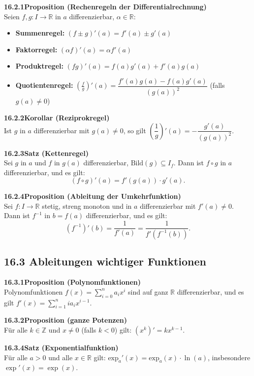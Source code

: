 \documentclass[a4paper,12pt]{article}
\newcommand{\gentry}[3]{%
  \noindent\textbf{#1\quad #2}\nopagebreak\\[0.2em]
  #3\par\smallskip
}
\begin{document}
\gentry{16.2.1}{Proposition (Rechenregeln der Differentialrechnung)}{%
  Seien $f, g: I \to \mathbb{R}$ in $a$ differenzierbar, $\alpha \in \mathbb{R}$:
  \begin{itemize}[topsep=2pt,itemsep=1pt]
    \item \textbf{Summenregel:} $(f \pm g)'(a) = f'(a) \pm g'(a)$
    \item \textbf{Faktorregel:} $(\alpha f)'(a) = \alpha f'(a)$
    \item \textbf{Produktregel:} $(fg)'(a) = f(a)g'(a) + f'(a)g(a)$
    \item \textbf{Quotientenregel:} $\left(\frac{f}{g}\right)'(a) = \dfrac{f'(a)g(a) - f(a)g'(a)}{(g(a))^2}$
      \quad (falls $g(a) \neq 0$)
  \end{itemize}
}

\gentry{16.2.2}{Korollar (Reziprokregel)}{%
  Ist $g$ in $a$ differenzierbar mit $g(a) \neq 0$, so gilt
  $\left(\dfrac{1}{g}\right)'(a) = -\dfrac{g'(a)}{(g(a))^2}$.
}

\gentry{16.2.3}{Satz (Kettenregel)}{%
  Sei $g$ in $a$ und $f$ in $g(a)$ differenzierbar, $\mathrm{Bild}(g) \subseteq I_f$.
  Dann ist $f \circ g$ in $a$ differenzierbar, und es gilt:
  \[
    (f \circ g)'(a) = f'(g(a)) \cdot g'(a).
  \]
}

\gentry{16.2.4}{Proposition (Ableitung der Umkehrfunktion)}{%
  Sei $f: I \to \mathbb{R}$ stetig, streng monoton und in $a$ differenzierbar mit
  $f'(a) \neq 0$. Dann ist $f^{-1}$ in $b = f(a)$ differenzierbar, und es gilt:
  \[
    (f^{-1})'(b) = \frac{1}{f'(a)} = \frac{1}{f'(f^{-1}(b))}.
  \]
}

\subsection*{16.3 \quad Ableitungen wichtiger Funktionen}

\gentry{16.3.1}{Proposition (Polynomfunktionen)}{%
  Polynomfunktionen $f(x) = \sum_{i=0}^n a_i x^i$ sind auf ganz $\mathbb{R}$
  differenzierbar, und es gilt $f'(x) = \sum_{i=1}^n i a_i x^{i-1}$.
}

\gentry{16.3.2}{Proposition (ganze Potenzen)}{%
  Für alle $k \in \mathbb{Z}$ und $x \neq 0$ (falls $k < 0$) gilt:
  $(x^k)' = k x^{k-1}$.
}

\gentry{16.3.4}{Satz (Exponentialfunktion)}{%
  Für alle $a > 0$ und alle $x \in \mathbb{R}$ gilt:
  $\mathrm{exp}_a'(x) = \mathrm{exp}_a(x) \cdot \ln(a)$, insbesondere $\exp'(x) = \exp(x)$.
}
\end{document}
